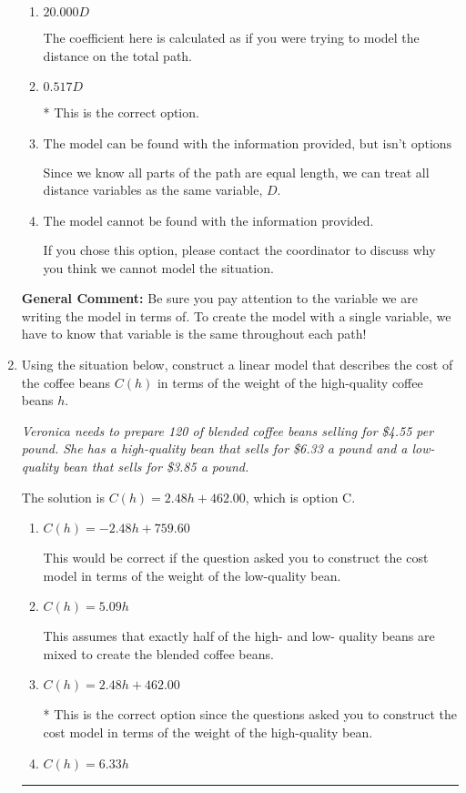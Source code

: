 \documentclass{extbook}[14pt]
\newcommand{\litem}[1]{\item #1

\rule{\textwidth}{0.4pt}}
\begin{document}
\begin{enumerate}
{\begin{enumerate}[label=\Alph*.]
The coefficient here is calculated by multiplying the distances together rather than adding.
\item \( 20.000 D \)

The coefficient here is calculated as if you were trying to model the distance on the total path.
\item \( 0.517 D \)

* This is the correct option.
\item \( \text{The model can be found with the information provided, but isn't options 1-3.} \)

Since we know all parts of the path are equal length, we can treat all distance variables as the same variable, $D$.
\item \( \text{The model cannot be found with the information provided.} \)

If you chose this option, please contact the coordinator to discuss why you think we cannot model the situation.
\end{enumerate}

\textbf{General Comment:} Be sure you pay attention to the variable we are writing the model in terms of. To create the model with a single variable, we have to know that variable is the same throughout each path!
}
\litem{
Using the situation below, construct a linear model that describes the cost of the coffee beans $C(h)$ in terms of the weight of the high-quality coffee beans $h$.

\begin{center}
    \textit{ Veronica needs to prepare 120 of blended coffee beans selling for \$4.55 per pound. She has a high-quality bean that sells for \$6.33 a pound and a low-quality bean that sells for \$3.85 a pound. }
\end{center}
The solution is \( C(h) = 2.48 h + 462.00 \), which is option C.\begin{enumerate}[label=\Alph*.]
\item \( C(h) = -2.48 h + 759.60 \)

This would be correct if the question asked you to construct the cost model in terms of the weight of the low-quality bean.
\item \( C(h) = 5.09 h \)

This assumes that exactly half of the high- and low- quality beans are mixed to create the blended coffee beans.
\item \( C(h) = 2.48 h + 462.00 \)

* This is the correct option since the questions asked you to construct the cost model in terms of the weight of the high-quality bean.
\item \( C(h) = 6.33 h \)


\end{enumerate}}
\end{enumerate}
\end{document}
